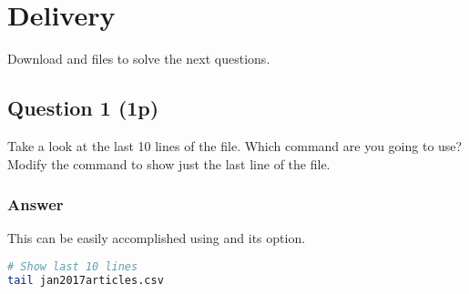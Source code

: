 \setcounter{section}{0}
\setcounter{page}{1}

\nocite{o:genome}

\section{Delivery} %
Download  and  files to solve the next questions.

\subsection*{Question 1 (1p)}
Take a look at the last 10 lines of the  file. Which command are you going to use? Modify the command to show just the last line of the file.

\subsubsection*{Answer}
This can be easily accomplished using  and its  option.

\begin{lstlisting}[language=bash]
# Show last 10 lines
tail jan2017articles.csv
\end{lstlisting}

